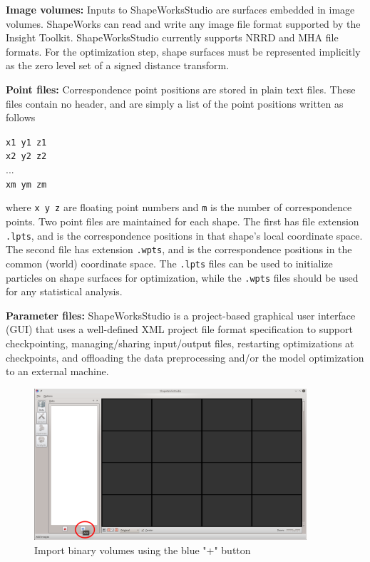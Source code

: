 \documentclass[letterpaper,12pt]{article}   %
\begin{document}
\noindent\textbf{Image volumes:} Inputs to ShapeWorksStudio are surfaces embedded in image volumes. ShapeWorks can read and write any image file format supported by the Insight Toolkit. ShapeWorksStudio currently supports NRRD and MHA file formats. For the optimization step, shape surfaces must be represented implicitly as the zero level set of a signed distance transform.

\vspace{0.1in}
\noindent\textbf{Point files:} Correspondence point positions are stored in plain text files. These files contain no header, and are simply a list of the point positions written as follows 

\noindent\texttt{x1 y1 z1}\\
\noindent\texttt{x2 y2 z2}\\
... \\
\noindent\texttt{xm ym zm}

\noindent where \texttt{x y z} are floating point numbers and \texttt{m} is the number of correspondence points. Two point files are maintained for each shape. The first has file extension \texttt{.lpts}, and is the correspondence positions in that shape’s local coordinate space. The second file has extension \texttt{.wpts}, and is the correspondence positions in the common (world) coordinate space. The \texttt{.lpts} files can be used to initialize particles on shape surfaces for optimization, while the \texttt{.wpts} files should be used for any statistical analysis.

\vspace{0.1in}
\noindent\textbf{Parameter files:} ShapeWorksStudio is a project-based graphical user interface (GUI) that uses a well-defined XML project file format specification to support checkpointing, managing/sharing input/output files, restarting optimizations at checkpoints, and offloading the data preprocessing and/or the model optimization to an external machine.
\vspace{0.2in}

\begin{figure}[!htp]
	\centering
	\includegraphics[width=0.9\textwidth]{figs_v2/add.png}
	\caption{Import binary volumes using the blue "+" button}
	\label{fig:add}
\end{figure}
\end{document}
